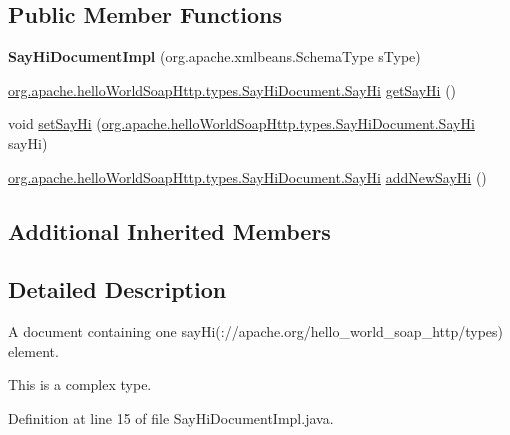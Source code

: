 \subsection*{Public Member Functions}
\begin{DoxyCompactItemize}
\item 
\hypertarget{classorg_1_1apache_1_1hello_world_soap_http_1_1types_1_1impl_1_1_say_hi_document_impl_a4f834f3a691c0883cd5ccdf5f3641873}{}{\bfseries Say\+Hi\+Document\+Impl} (org.\+apache.\+xmlbeans.\+Schema\+Type s\+Type)\label{classorg_1_1apache_1_1hello_world_soap_http_1_1types_1_1impl_1_1_say_hi_document_impl_a4f834f3a691c0883cd5ccdf5f3641873}

\item 
\hyperlink{interfaceorg_1_1apache_1_1hello_world_soap_http_1_1types_1_1_say_hi_document_1_1_say_hi}{org.\+apache.\+hello\+World\+Soap\+Http.\+types.\+Say\+Hi\+Document.\+Say\+Hi} \hyperlink{classorg_1_1apache_1_1hello_world_soap_http_1_1types_1_1impl_1_1_say_hi_document_impl_a3527f51f2992d3e1748ff47714e19d68}{get\+Say\+Hi} ()
\item 
void \hyperlink{classorg_1_1apache_1_1hello_world_soap_http_1_1types_1_1impl_1_1_say_hi_document_impl_a4e9cf1753bdd4af6a13e55faa1446c41}{set\+Say\+Hi} (\hyperlink{interfaceorg_1_1apache_1_1hello_world_soap_http_1_1types_1_1_say_hi_document_1_1_say_hi}{org.\+apache.\+hello\+World\+Soap\+Http.\+types.\+Say\+Hi\+Document.\+Say\+Hi} say\+Hi)
\item 
\hyperlink{interfaceorg_1_1apache_1_1hello_world_soap_http_1_1types_1_1_say_hi_document_1_1_say_hi}{org.\+apache.\+hello\+World\+Soap\+Http.\+types.\+Say\+Hi\+Document.\+Say\+Hi} \hyperlink{classorg_1_1apache_1_1hello_world_soap_http_1_1types_1_1impl_1_1_say_hi_document_impl_a6ac0ce42bb27cf5ba458763507dcb300}{add\+New\+Say\+Hi} ()
\end{DoxyCompactItemize}
\subsection*{Additional Inherited Members}


\subsection{Detailed Description}
A document containing one say\+Hi(\+://apache.org/hello\+\_\+world\+\_\+soap\+\_\+http/types) element.

This is a complex type. 

Definition at line 15 of file Say\+Hi\+Document\+Impl.\+java.



